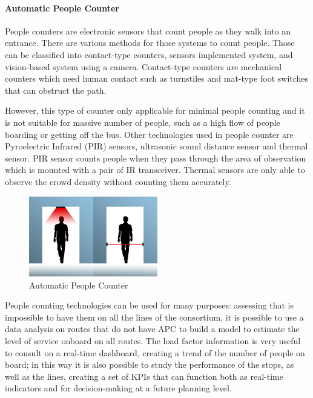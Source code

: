 \paragraph{Automatic People Counter}
People counters are electronic sensors that count people as they walk into an entrance. There are various methods for those systems to count people. Those can be classified into contact-type counters, sensors implemented system, and vision-based system using a camera. Contact-type counters are mechanical counters which need human contact such as turnstiles and mat-type foot switches that can obstruct the path. 

However, this type of counter only applicable for minimal people counting and it is not suitable for massive number of people, such as a high flow of people boarding or getting off the bus. Other technologies used in people counter are Pyroelectric Infrared (PIR) sensors, ultrasonic sound distance sensor and thermal sensor. PIR sensor counts people when they pass through the area of observation which is mounted with a pair of IR transceiver. Thermal sensors are only able to observe the crowd density without counting them accurately. 

\begin{figure}[h!]
    \centering
    \includegraphics[width=0.5\textwidth]{Images/New Technologies/APC.jpg}
    \caption{Automatic People Counter\cite{apcimage}}
    \label{fig:APC}
\end{figure}

People counting technologies can be used for many purposes: assessing that is impossible to have them on all the lines of the consortium, it is possible to use a data analysis on routes that do not have APC to build a model to estimate the level of service onboard on all routes. The load factor information is very useful to consult on a real-time dashboard, creating a trend of the number of people on board; in this way it is also possible to study the performance of the stops, as well as the lines, creating a set of KPIs that can function both as real-time  indicators and for decision-making at a future planning level.


